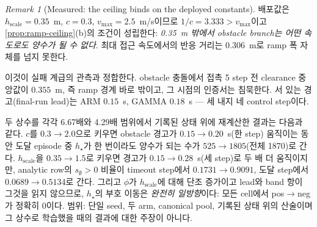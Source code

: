 \documentclass[11pt]{article}
\theoremstyle{plain}
\theoremstyle{definition}
\theoremstyle{remark}
\newtheorem{remark}[theorem]{Remark}
\begin{document}
\begin{remark}[Measured: the ceiling binds on the deployed constants]\label{rem:ramp-measured}
배포값은 $h_{\mathrm{scale}}=0.35$~m, $c=0.3$, $v_{\max}=2.5$~m/s이므로 $1/c=3.333>v_{\max}$이고
\cref{prop:ramp-ceiling}(b)의 조건이 성립한다: \emph{0.35~m 밖에서 obstacle branch는 어떤 속도로도
양수가 될 수 없다}. 최대 접근 속도에서의 반응 거리는 $0.306$~m로 ramp 폭 자체를 넘지 못한다.

이것이 실패 계급의 관측과 정합한다. obstacle 충돌에서 접촉 5 step 전 clearance 중앙값이
$0.355$~m, 즉 ramp 경계 바로 밖이고, 그 시점의 인증서는 침묵한다. 서 있는 경고(final-run lead)는
ARM $0.15$~s, GAMMA $0.18$~s --- 세 내지 네 control step이다.

두 상수를 각각 6.67배와 4.29배 범위에서 기록된 상태 위에 재계산한 결과는 다음과 같다. $c$를
$0.3\to2.0$으로 키우면 obstacle 경고가 $0.15\to0.20$~s(한 step) 움직이는 동안 도달 episode 중
$h_\star$가 한 번이라도 양수가 되는 수가 $525\to1805$(전체 1870)로 간다. $h_{\mathrm{scale}}$을
$0.35\to1.5$로 키우면 경고가 $0.15\to0.28$~s(세 step)로 두 배 더 움직이지만, analytic row의
$s_\emptyset>0$ 비율이 timeout step에서 $0.1731\to0.9091$, 도달 step에서 $0.0689\to0.5134$로
간다. 그리고 $\phi$가 $h_{\mathrm{scale}}$에 대해 단조 증가이고 lead와 band 항이 그것을 읽지
않으므로, $h_\star$의 부호 이동은 \emph{완전히 일방향}이다: 모든 cell에서 pos$\to$neg가 정확히 $0$이다.
범위: 단일 seed, 두 arm, canonical pool, 기록된 상태 위의 산술이며 그 상수로 학습했을 때의
결과에 대한 주장이 아니다.
\end{remark}
\end{document}
